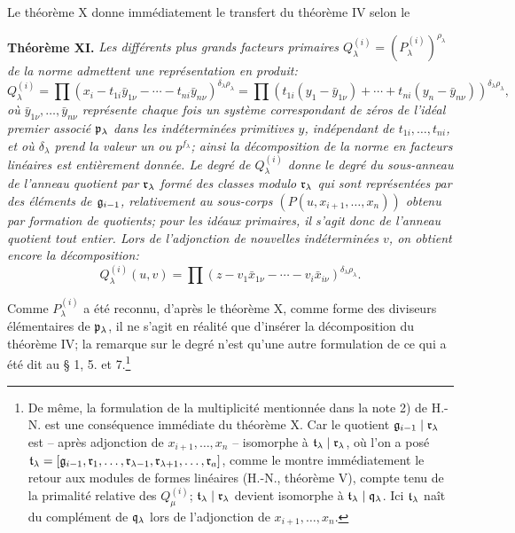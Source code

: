 Le théorème X donne immédiatement le transfert du théorème IV selon le

\textbf{Théorème XI.} \emph{Les différents plus grands facteurs primaires $Q_\lambda^{(i)}=(P_\lambda^{(i)})^{\rho_\lambda}$ de la norme admettent une représentation en produit:}
\[
 Q_\lambda^{(i)}=\prod (x_i-t_{1i}\bar y_{1\nu}-\cdots-t_{ni}\bar y_{n\nu})^{\delta_\lambda\rho_\lambda}
 =\prod (t_{1i}(y_1-\bar y_{1\nu})+\cdots+t_{ni}(y_n-\bar y_{n\nu}))^{\delta_\lambda\rho_\lambda},
\]
\emph{où $\bar y_{1\nu},\ldots,\bar y_{n\nu}$ représente chaque fois un système correspondant de zéros de l'idéal premier associé $\mathfrak p_\lambda$ dans les indéterminées primitives $y$, indépendant de $t_{1i},\ldots,t_{ni}$, et où $\delta_\lambda$ prend la valeur un ou $p^{f_\lambda}$; ainsi la décomposition de la norme en facteurs linéaires est entièrement donnée. Le degré de $Q_\lambda^{(i)}$ donne le degré du sous-anneau de l'anneau quotient par $\mathfrak r_\lambda$ formé des classes modulo $\mathfrak r_\lambda$ qui sont représentées par des éléments de $\mathfrak g_{i-1}$, relativement au sous-corps $(P(u,x_{i+1},\ldots,x_n))$ obtenu par formation de quotients; pour les idéaux primaires, il s'agit donc de l'anneau quotient tout entier. Lors de l'adjonction de nouvelles indéterminées $v$, on obtient encore la décomposition:}
\[
 Q_\lambda^{(i)}(u,v)=\prod (z-v_1\bar x_{1\nu}-\cdots-v_i\bar x_{i\nu})^{\delta_\lambda\rho_\lambda}.
\]

Comme $P_\lambda^{(i)}$ a été reconnu, d'après le théorème X, comme forme des diviseurs élémentaires de $\mathfrak p_\lambda$, il ne s'agit en réalité que d'insérer la décomposition du théorème IV; la remarque sur le degré n'est qu'une autre formulation de ce qui a été dit au \S{} 1, 5. et 7.\footnote{De même, la formulation de la multiplicité mentionnée dans la note 2) de H.-N. est une conséquence immédiate du théorème X. Car le quotient $\mathfrak g_{i-1}\mid\mathfrak r_\lambda$ est -- après adjonction de $x_{i+1},\ldots,x_n$ -- isomorphe à $\mathfrak t_\lambda\mid\mathfrak r_\lambda$, où l'on a posé $\mathfrak t_\lambda=[\mathfrak g_{i-1},\mathfrak r_1,\ldots,\mathfrak r_{\lambda-1},\mathfrak r_{\lambda+1},\ldots,\mathfrak r_a]$, comme le montre immédiatement le retour aux modules de formes linéaires (H.-N., théorème V), compte tenu de la primalité relative des $Q_\mu^{(i)}$; $\mathfrak t_\lambda\mid\mathfrak r_\lambda$ devient isomorphe à $\mathfrak t_\lambda\mid\mathfrak q_\lambda$. Ici $\mathfrak t_\lambda$ naît du complément de $\mathfrak q_\lambda$ lors de l'adjonction de $x_{i+1},\ldots,x_n$.}
